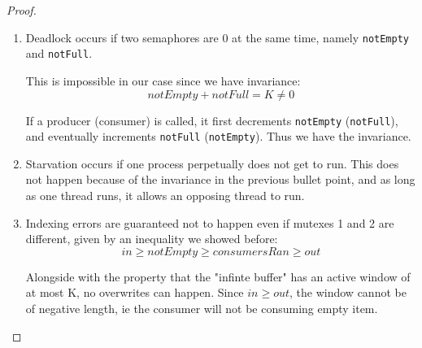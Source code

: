 \documentclass[12pt, a4paper]{article}
\begin{document}
\begin{proof}
\begin{enumerate}
{        The \verb|out| variable is incremented only if a consumer thread is ran,
        and that gives us the last equality.
      }

    \item {
        Deadlock occurs if two semaphores are 0 at the same time, namely
        \verb|notEmpty| and \verb|notFull|.

        This is impossible in our case since we have invariance:
        \[ notEmpty + notFull = K \neq 0 \]

        If a producer (consumer) is called, it first decrements \verb|notEmpty|
        (\verb|notFull|), and eventually increments \verb|notFull|
        (\verb|notEmpty|). Thus we have the invariance.
      }
    \item {
        Starvation occurs if one process perpetually does not get to run. This
        does not happen because of the invariance in the previous bullet point,
        and as long as one thread runs, it allows an opposing thread to run.
      }
    \item {
        Indexing errors are guaranteed not to happen even if mutexes 1 and 2
        are different, given by an inequality we showed before:
        \[
          in \geq notEmpty \geq consumersRan \geq out
        \]

        Alongside with the property that the "infinte buffer" has an active
        window of at most K, no overwrites can happen. Since $in \geq out$,
        the window cannot be of negative length, ie the consumer will not
        be consuming empty item.
      }
  \end{enumerate}
\end{proof}
\end{document}
